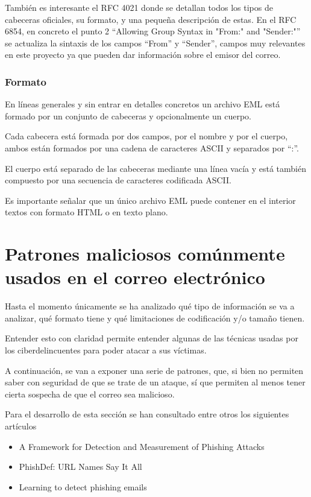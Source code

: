 También es interesante el RFC 4021\cite{rfc4021} donde se detallan todos los tipos de cabeceras oficiales, su formato, y una pequeña descripción de estas. En el RFC 6854\cite{rfc6854}, en concreto el punto 2 “Allowing Group Syntax in "From:" and "Sender:"” se actualiza la sintaxis de los campos “From” y “Sender”, campos muy relevantes en este proyecto ya que pueden dar información sobre el emisor del correo.

\subsubsection{Formato}
En líneas generales y sin entrar en detalles concretos un archivo EML está formado por un conjunto de cabeceras y opcionalmente un cuerpo. 

Cada cabecera está formada por dos campos, por el nombre y por el cuerpo, ambos están formados por una cadena de caracteres ASCII y separados por “:”.

El cuerpo está separado de las cabeceras mediante una línea vacía y está también compuesto por una secuencia de caracteres codificada ASCII. 

Es importante señalar que un único archivo EML puede contener en el interior textos con formato HTML o en texto plano.

\section{Patrones maliciosos comúnmente usados en el correo electrónico}
Hasta el momento únicamente se ha analizado qué tipo de información se va a analizar, qué formato tiene y qué limitaciones de codificación y/o tamaño tienen. 

Entender esto con claridad permite entender algunas de las técnicas usadas por los ciberdelincuentes para poder atacar a sus víctimas. 

A continuación, se van a exponer una serie de patrones, que, si bien no permiten saber con seguridad de que se trate de un ataque, sí que permiten al menos tener cierta sospecha de que el correo sea malicioso.

Para el desarrollo de esta sección se han consultado entre otros los siguientes artículos 

\begin{itemize}
    \item A Framework for Detection and Measurement of Phishing Attacks \cite{phishing1}
    \item PhishDef: URL Names Say It All \cite{phishing2}
    \item Learning to detect phishing emails \cite{phishing3}
\end{itemize}

